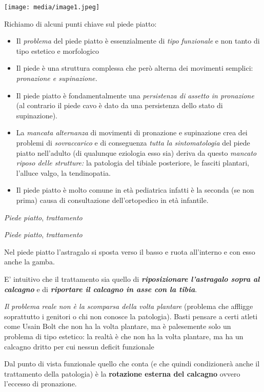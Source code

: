 \documentclass[]{article}
\date{}
\begin{document}
\texttt{[image: media/image1.jpeg]}

Richiamo di alcuni punti chiave sul piede piatto:

\begin{itemize}
\item
  Il \emph{problema} del piede piatto è essenzialmente di \emph{tipo}
  \emph{funzionale} e non tanto di tipo estetico e morfologico
\item
  Il piede è una struttura complessa che però alterna dei movimenti
  semplici: \emph{pronazione e supinazione.}
\item
  Il piede piatto è fondamentalmente una \emph{persistenza di assetto in
  pronazione} (al contrario il piede cavo è dato da una persistenza
  dello stato di supinazione).
\item
  La \emph{mancata alternanza} di movimenti di pronazione e supinazione
  crea dei problemi di \emph{sovraccarico} e di conseguenza \emph{tutta
  la sintomatologia} del piede piatto nell'adulto (di qualunque
  eziologia esso sia) deriva da questo \emph{mancato riposo delle
  strutture:} la patologia del tibiale posteriore, le fasciti plantari,
  l'alluce valgo, la tendinopatia.
\item
  Il piede piatto è molto comune in età pediatrica infatti è la seconda
  (se non prima) causa di consultazione dell'ortopedico in età
  infantile.
\end{itemize}

\emph{Piede piatto}, \emph{trattamento}

\emph{Piede piatto}, \emph{trattamento}

Nel piede piatto l'astragalo si sposta verso il basso e ruota
all'interno e con esso anche la gamba.

E' intuitivo che il trattamento sia quello di
\textbf{\emph{riposizionare l'astragalo sopra al calcagno}} e di
\textbf{\emph{riportare il calcagno in asse con la tibia}}.

\emph{Il problema reale non è la scomparsa della volta plantare}
(problema che affligge soprattutto i genitori o chi non conosce la
patologia). Basti pensare a certi atleti come Usain Bolt che non ha la
volta plantare, ma è palesemente solo un problema di tipo estetico: la
realtà è che non ha la volta plantare, ma ha un calcagno dritto per cui
nessun deficit funzionale

Dal punto di vista funzionale quello che conta (e che quindi
condizionerà anche il trattamento della patologia) è la
\textbf{rotazione esterna del calcagno} ovvero l'eccesso di pronazione.
\end{document}
